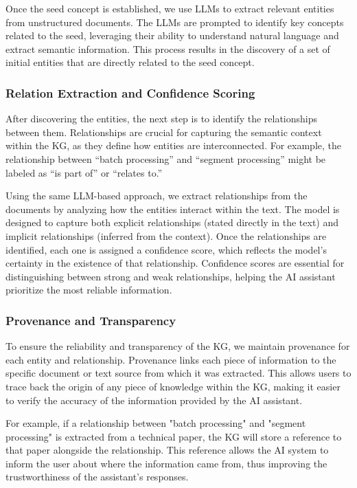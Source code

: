 Once the seed concept is established, we use LLMs to extract relevant entities from unstructured documents. The LLMs are prompted to identify key concepts related to the seed, leveraging their ability to understand natural language and extract semantic information. This process results in the discovery of a set of initial entities that are directly related to the seed concept.

\subsubsection{Relation Extraction and Confidence Scoring}

After discovering the entities, the next step is to identify the relationships between them. Relationships are crucial for capturing the semantic context within the KG, as they define how entities are interconnected. For example, the relationship between “batch processing” and “segment processing” might be labeled as “is part of” or “relates to.”

Using the same LLM-based approach, we extract relationships from the documents by analyzing how the entities interact within the text. The model is designed to capture both explicit relationships (stated directly in the text) and implicit relationships (inferred from the context). Once the relationships are identified, each one is assigned a confidence score, which reflects the model's certainty in the existence of that relationship. Confidence scores are essential for distinguishing between strong and weak relationships, helping the AI assistant prioritize the most reliable information.

\subsubsection{Provenance and Transparency}

To ensure the reliability and transparency of the KG, we maintain provenance for each entity and relationship. Provenance links each piece of information to the specific document or text source from which it was extracted. This allows users to trace back the origin of any piece of knowledge within the KG, making it easier to verify the accuracy of the information provided by the AI assistant.

For example, if a relationship between "batch processing" and "segment processing" is extracted from a technical paper, the KG will store a reference to that paper alongside the relationship. This reference allows the AI system to inform the user about where the information came from, thus improving the trustworthiness of the assistant's responses.

